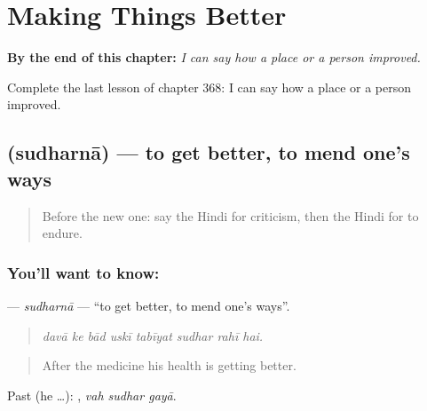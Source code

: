 
\chapter{Making Things Better}
\label{ch:hi-making-things-better}

\begin{chapteropening}
\textbf{By the end of this chapter:} \emph{I can say how a place or a person improved.}

Complete the last lesson of chapter 368: I can say how a place or a person improved.
\end{chapteropening}

\section[\texorpdfstring{\hi{सुधरना} (sudharnā)}{सुधरना (sudharnā)}]{ (sudharnā) — to get better, to mend one's ways}

\label{lesson:HI-C368-sudharnaa}



\begin{quote}
Before the new one: say the Hindi for criticism, then the Hindi for to endure.
\end{quote}

\subsection*{You'll want to know: }
\textbf{} — \emph{sudharnā} — \textquotedblleft{}to get better, to mend one's ways\textquotedblright{}.

\begin{quote}
       
\end{quote}

\begin{quote}
\emph{davā ke bād uskī tabīyat sudhar rahī hai.}
\end{quote}

\begin{quote}
After the medicine his health is getting better.
\end{quote}

Past (he …):   , \emph{vah sudhar gayā}.

